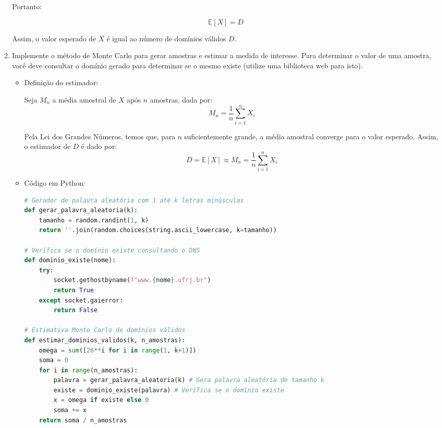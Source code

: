 \documentclass[12 pt]{article}
\begin{document}
\begin{enumerate}
\begin{tcolorbox}[colframe=black, title=Resposta:]
        Portanto:
        
        $$
        \mathbb{E}[X] = D
        $$
        
        Assim, o valor esperado de $X$ é igual ao número de domínios válidos $D$.



    \end{tcolorbox}
    \newpage
    \item Implemente o método de Monte Carlo para gerar amostras e estimar a medida de interesse. Para determinar o valor de uma amostra, você deve consultar o domínio gerado para determinar se o mesmo existe (utilize uma biblioteca web para isto).
    \begin{tcolorbox}[colframe=black, title=Resposta:]
        \begin{itemize}
            \item Definição do estimador:
        
        Seja $M_n$ a média amostral de $X$ após $n$ amostras, dada por:
        $$
        M_n = \frac{1}{n} \sum_{i=1}^n X_i
        $$

        Pela Lei dos Grandes Números, temos que, para $n$ suficientemente grande, a média amostral converge para o valor esperado. Assim, o estimador de $D$ é dado por:
        $$
        D = \mathbb{E}[X] \approx M_n = \frac{1}{n} \sum_{i=1}^n X_i
        $$

        \item Código em Python:
        \begin{lstlisting}[language=Python]
# Gerador de palavra aleatória com 1 até k letras minúsculas
def gerar_palavra_aleatoria(k):
    tamanho = random.randint(1, k)
    return ''.join(random.choices(string.ascii_lowercase, k=tamanho))

# Verifica se o domínio existe consultando o DNS
def dominio_existe(nome):
    try:
        socket.gethostbyname(f"www.{nome}.ufrj.br")
        return True
    except socket.gaierror:
        return False

# Estimativa Monte Carlo de domínios válidos
def estimar_dominios_validos(k, n_amostras):
    omega = sum([26**i for i in range(1, k+1)])
    soma = 0
    for i in range(n_amostras):
        palavra = gerar_palavra_aleatoria(k) # Gera palavra aleatória de tamanho k
        existe = dominio_existe(palavra) # Verifica se o domínio existe
        x = omega if existe else 0
        soma += x
    return soma / n_amostras
        \end{lstlisting}
    \end{itemize}


\end{tcolorbox}
\end{enumerate}
\end{document}
